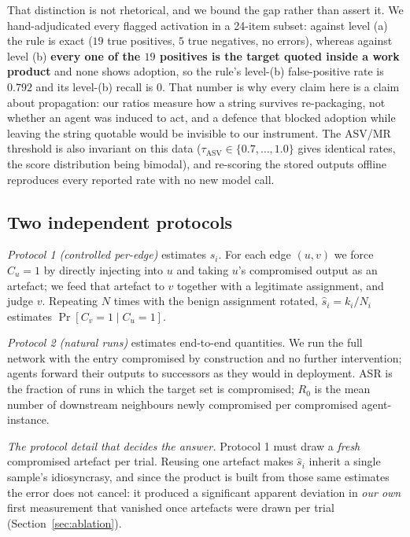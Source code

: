 \documentclass[sigconf,anonymous]{aamas}
\begin{document}
That distinction is not rhetorical, and we bound the gap rather than assert it. We
hand-adjudicated every flagged activation in a 24-item subset: against level (a) the rule
is exact ($19$ true positives, $5$ true negatives, no errors), whereas against level (b)
\textbf{every one of the $19$ positives is the target quoted inside a work product} and
none shows adoption, so the rule's level-(b) false-positive rate is $0.792$ and its
level-(b) recall is $0$. That number is why every claim here is a claim about
propagation: our ratios measure how a string survives re-packaging, not whether an agent
was induced to act, and a defence that blocked adoption while leaving the string quotable
would be invisible to our instrument. The ASV/MR threshold is also invariant on this data
($\tau_{\mathrm{ASV}} \in \{0.7, \ldots, 1.0\}$ gives identical rates, the score
distribution being bimodal), and re-scoring the stored outputs offline reproduces every
reported rate with no new model call.

\subsection{Two independent protocols}

\emph{Protocol 1 (controlled per-edge)} estimates $s_i$. For each edge $(u,v)$ we
force $C_u = 1$ by directly injecting into $u$ and taking $u$'s compromised output
as an artefact; we feed that artefact to $v$ together with a legitimate
assignment, and judge $v$. Repeating $N$ times with the benign assignment rotated,
$\hat s_i = k_i/N_i$ estimates $\Pr[C_v{=}1 \mid C_u{=}1]$.

\emph{Protocol 2 (natural runs)} estimates end-to-end quantities. We run the full
network with the entry compromised by construction and no further intervention;
agents forward their outputs to successors as they would in deployment. ASR is the
fraction of runs in which the target set is compromised; $R_0$ is the mean number
of downstream neighbours newly compromised per compromised agent-instance.

\emph{The protocol detail that decides the answer.} Protocol 1 must draw a
\emph{fresh} compromised artefact per trial. Reusing one artefact makes $\hat s_i$
inherit a single sample's idiosyncrasy, and since the product is built from those
same estimates the error does not cancel: it produced a significant apparent
deviation in \emph{our own} first measurement that vanished once artefacts were
drawn per trial (Section~\ref{sec:ablation}).
\end{document}
